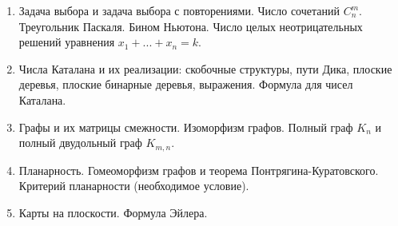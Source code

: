 %
%

\begin{enumerate}

\item Задача выбора и задача выбора с повторениями. Число сочетаний $C_n^m$. Треугольник Паскаля. Бином Ньютона. Число целых неотрицательных решений уравнения $x_1 + . . . + x_n = k$.

\item Числа Каталана и их реализации: скобочные структуры, пути Дика, плоские деревья, плоские бинарные деревья, выражения. Формула для чисел Каталана.

\item Графы и их матрицы смежности. Изоморфизм графов. Полный граф $K_n$ и полный двудольный граф $K_{m,n}$.

\item Планарность. Гомеоморфизм графов и теорема Понтрягина-Куратовского. Критерий планарности (необходимое условие).

\item Карты на плоскости. Формула Эйлера.

\end{enumerate}
